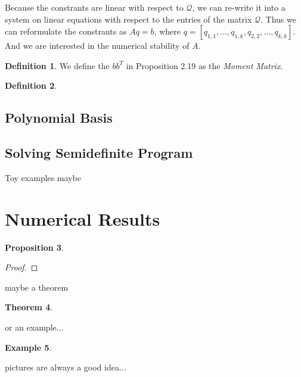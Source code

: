 \documentclass[12pt]{amsart}
\numberwithin{equation}{section}
\newtheorem{thm}{Theorem}
\newtheorem{prop}[thm]{Proposition}
\theoremstyle{definition}
\newtheorem{definition}[thm]{Definition}
\newtheorem{example}[thm]{Example}
\numberwithin{thm}{section}
\begin{document}
Because the constrants are linear with respect to $\mathcal{Q}$, we can re-write it into a system on linear equations with respect to the entries of the matrix $\mathcal{Q}$. Thus we can reformulate the constrants as
$A q = b$, where $q = [q_{1,1}, ..., q_{1, k}, q_{2, 2}, ... ,q_{k, k}]$. And we are interested in the numerical stability of $A$.

\begin{definition}
     We define the $b b^T$ in Proposition 2.19 as the \emph{Moment Matrix}.
\end{definition}



\begin{definition}
     
\end{definition}


\subsection{Polynomial Basis}
\label{Sec:polynomial Basis}

\subsection{Solving Semidefinite Program}
\label{Sec:Solving Semidefinite Program}




Toy examples maybe

\newpage
\section{Numerical Results}


\begin{prop}

\end{prop}

\begin{proof}

\end{proof}

maybe a theorem


\begin{thm}

\end{thm}

or an example...
\begin{example}

\end{example}

pictures are always a good idea...
\end{document}
